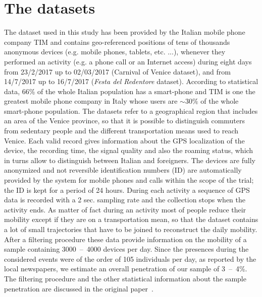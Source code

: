 \documentclass{standalone}
\begin{document}
\section*{The datasets}

The dataset used in this study has been provided by the Italian mobile phone company TIM and contains geo-referenced positions of tens of thousands anonymous devices (e.g. mobile phones, tablets, etc. ...), whenever they performed an activity (e.g. a phone call or an Internet access) during eight days from 23/2/2017 up to 02/03/2017 (Carnival of Venice dataset), and from 14/7/2017 up to 16/7/2017 (\emph{Festa del Redentore} dataset).
According to statistical data, 66\% of the whole Italian population has a smart-phone and TIM is one the greatest mobile phone company in Italy whose users are $\sim30\%$ of the whole smart-phone population.
The datasets refer to a geographical region that includes an area of the Venice province, so that it is possible to distinguish commuters from sedentary people and the different transportation means used to reach Venice.
Each valid record gives information about the GPS localization of the device, the recording time, the signal quality and also the roaming status, which in turns allow to distinguish between Italian and
foreigners.
The devices are fully anonymized and not reversible identification numbers (ID) are automatically provided by the system for mobile phones and calls within the scope of the trial; the ID is kept for a period of 24 hours.
During each activity a sequence of GPS data is recorded with a 2 sec. sampling rate and the collection stops when the activity ends.
As matter of fact during an activity most of people reduce their mobility except if they are on a transportation mean, so that the dataset contains a lot of small trajectories that have to be joined to reconstruct the daily mobility.
After a filtering procedure these data provide information on the mobility of a sample containing 3000~–~4000 devices per day.
Since the presences during the considered events were of the order of 105 individuals per day, as reported by the local newspapers, we estimate an overall penetration of our sample of 3~–~4\%.
The filtering procedure and the other statistical information about the sample penetration are discussed in the original paper~\cite{Mizzi2018}.
\end{document}
